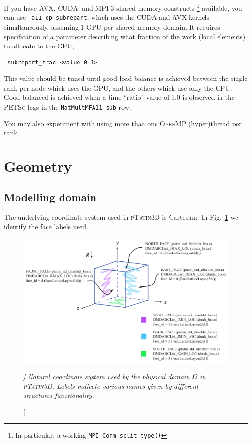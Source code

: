\documentclass[paper=a4, fontsize=10pt,twoside]{scrartcl}
\newcommand{\ptat}{{{\textsc{pTatin3D}}}}
\newcommand{\PETSc}{{{\textsc{PETSc}}}}
\newcommand{\CUDA}{{{\textsc{CUDA}}}}
\newcommand{\OpenMP}{{{\textsc{OpenMP}}}}
\begin{document}
If you have AVX, \CUDA{}, and MPI-3 shared memory constructs \footnote{In particular, a working \lstinline{MPI_Comm_split_type()}} available, you can use \texttt{-a11\_op subrepart}, which uses the \CUDA{} and AVX kernels simultaneously, assuming $1$ GPU per shared-memory domain. It requires specification of a parameter describing what fraction of the work (local elements) to allocate to the GPU,
\begin{lstlisting}
-subrepart_frac <value 0-1>
\end{lstlisting}
This value should be tuned until good load balance is achieved between the single rank per node which uses the GPU, and the others which use only the CPU. Good balanced is achieved when a time ``ratio'' value of $1.0$ is observed in the \PETSc{} logs in the \texttt{MatMultMFA11\_sub} row.

You may also experiment with using more than one \OpenMP{} (hyper)thread per rank.

\section{Geometry}

\subsection{Modelling domain}
The underlying coordinate system used in {\ptat} is Cartesian. In Fig.~\ref{fig:domain_coord} we identify the face labels used.
\begin{figure} [hbtp]
\center
\includegraphics[height=0.4\textheight]{figs/pt3d_coordinate_system.pdf}
\caption[\itshape ]
{\itshape Natural coordinate system used by the physical domain $\Omega$ in {\ptat}. Labels indicate various names given by different structures functionality.}
\label{fig:domain_coord}
\end{figure}
\end{document}
